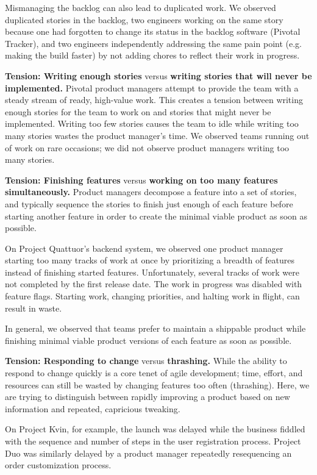 Mismanaging the backlog can also lead to duplicated work. We observed duplicated stories in the backlog, two engineers working on the same story because one had forgotten to change its status in the backlog software (Pivotal Tracker), and two engineers independently addressing the same pain point (e.g. making the build faster) by not adding chores to reflect their work in progress.

\textbf{Tension: Writing enough stories} versus \textbf{writing stories that will never be implemented.}
Pivotal product managers attempt to provide the team with a steady stream of ready, high-value work. This creates a tension between writing enough stories for the team to work on and  stories that might never be implemented. Writing too few stories causes the team to idle while writing too many stories wastes the product manager's time. We observed teams running out of work on rare occasions; we did not observe product managers writing too many stories.  

\textbf{Tension: Finishing features} versus \textbf{working on too many features simultaneously.}
Product managers decompose a feature into a set of stories, and typically sequence the stories to finish just enough of each feature before starting another feature in order to create the minimal viable product as soon as possible. 

On Project Quattuor's backend system, we observed one product manager starting too many tracks of work at once by prioritizing a breadth of features instead of finishing started features. Unfortunately, several tracks of work were not completed by the first release date. The work in progress was disabled with feature flags. Starting work, changing priorities, and halting work in flight, can result in waste.

In general, we observed that teams prefer to maintain a shippable product while finishing minimal viable product versions of each feature as soon as possible.

\textbf{Tension: Responding to change} versus \textbf{thrashing.}
While the ability to respond to change quickly is a core tenet of agile development; time, effort, and resources can still be wasted by changing features too often (thrashing). Here, we are trying to distinguish between rapidly improving a product based on new information and repeated, capricious tweaking. 

On Project Kvin, for example, the launch was delayed while the business fiddled with the sequence and number of steps in the user registration process. Project Duo was similarly delayed by a product manager repeatedly resequencing an order customization process. 

